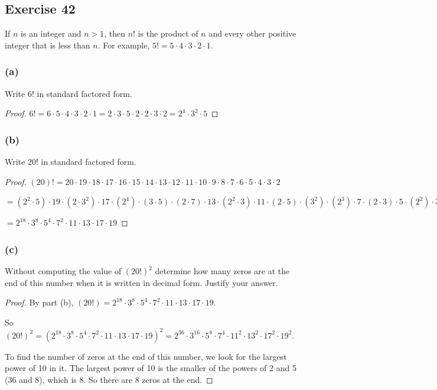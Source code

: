 \documentclass[14pt]{extarticle}
\begin{document}
\subsection{Exercise 42}
If $n$ is an integer and $n > 1$, then $n!$ is the product of $n$ and every other positive integer that is less than $n$. For example, $5! = 5\cdot4\cdot3\cdot2\cdot1$.

\subsubsection{(a)}
Write $6!$ in standard factored form.

\begin{proof}
$6! = 6 \cdot 5 \cdot 4 \cdot 3 \cdot 2 \cdot 1 = 2 \cdot 3 \cdot 5 \cdot 2 \cdot 2 \cdot 3 \cdot 2 = 2^4 \cdot 3^2  \cdot 5$
\end{proof}

\subsubsection{(b)}
Write $20!$ in standard factored form.

\begin{proof}
$(20)! = 20 \cdot 19 \cdot 18 \cdot 17 \cdot 16 \cdot 15 \cdot 14 \cdot 13 \cdot 12 \cdot 11 \cdot 10 \cdot 9 \cdot 8 \cdot 7 \cdot 6 \cdot 5 \cdot 4 \cdot 3 \cdot 2$

$= (2^2 \cdot 5) \cdot 19 \cdot (2 \cdot 3^2) \cdot 17 \cdot (2^4) \cdot (3 \cdot 5) \cdot (2 \cdot 7) \cdot 13 \cdot (2^2 \cdot 3) \cdot 11 \cdot (2 \cdot 5) \cdot (3^2) \cdot (2^3) \cdot 7 \cdot (2 \cdot 3) \cdot 5 \cdot (2^2) \cdot 3 \cdot 2$

$= 2^{18} \cdot 3^{8} \cdot 5^4 \cdot 7^2 \cdot 11 \cdot 13 \cdot 17 \cdot 19$
\end{proof}

\subsubsection{(c)}
Without computing the value of $(20!)^2$ determine how many zeros are at the end of this number when it is written in decimal form. Justify your answer.

\begin{proof}
By part (b), $(20!) = 2^{18} \cdot 3^{8} \cdot 5^4 \cdot 7^2 \cdot 11 \cdot 13 \cdot 17 \cdot 19$.

So $(20!)^2 = (2^{18} \cdot 3^{8} \cdot 5^4 \cdot 7^2 \cdot 11 \cdot 13 \cdot 17 \cdot 19)^2 = 2^{36} \cdot 3^{16} \cdot 5^8 \cdot 7^4 \cdot 11^2 \cdot 13^2 \cdot 17^2 \cdot 19^2$.

To find the number of zeros at the end of this number, we look for the largest power of 10 in it. The largest power of 10 is the smaller of the powers of 2 and 5 (36 and 8), which is 8. So there are 8 zeros at the end.
\end{proof}
\end{document}
